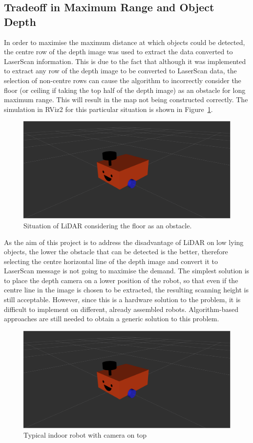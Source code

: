 \subsection{Tradeoff in Maximum Range and Object Depth}
\label{subsec:tradeoff}
In order to maximise the maximum distance at which objects could be detected, 
the centre row of the depth image was used to extract the data converted to LaserScan information. 
This is due to the fact that although it was implemented to extract any row of the depth image to be converted to LaserScan data, 
the selection of non-centre rows can cause the algorithm to incorrectly consider the floor (or ceiling if taking the top half of the depth image) 
as an obstacle for long maximum range. This will result in the map not being constructed correctly. 
The simulation in RViz2 for this particular situation is shown in Figure~\ref{fig:floor_obstacle}.
\begin{figure}[H]
    \centering
    \includegraphics[width=0.8\linewidth]{figs/robot.png}
    \caption{Situation of LiDAR considering the floor as an obstacle.}
    \label{fig:floor_obstacle}
\end{figure}
As the aim of this project is to address the disadvantage of LiDAR on low lying objects, 
the lower the obstacle that can be detected is the better, 
therefore selecting the centre horizontal line of the depth image 
and convert it to LaserScan message is not going to maximise the demand. 
The simplest solution is to place the depth camera on a lower position of the robot, 
so that even if the centre line in the image is chosen to be extracted, 
the resulting scanning height is still acceptable. 
However, since this is a hardware solution to the problem, 
it is difficult to implement on different, already assembled robots. 
Algorithm-based approaches are still needed to obtain a generic solution to this problem. 

\begin{figure}[H]
    \centering
    \includegraphics[width=0.8\linewidth]{figs/robot.png}
    \caption{Typical indoor robot with camera on top}
\end{figure}

